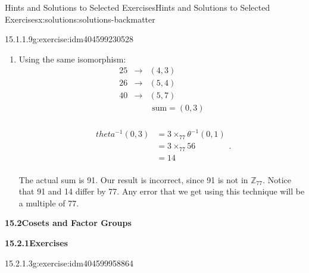 \documentclass[twoside,10pt,]{book}
\newcommand{\blocktitlefont}{\relax}
\numberwithin{equation}{section}
\begin{document}
\begin{solutions-chapter}{Hints and Solutions to Selected Exercises}{}{Hints and Solutions to Selected Exercises}{}{}{x:solutions:solutions-backmatter}
\begin{divisionsolution}{15.1.1.9}{}{g:exercise:idm404599230528}
\begin{enumerate}[label=(\alph*)]
\begin{equation*}
\begin{split}
& =55 +_{77}70\\
& =48\\
\end{split}\text{.}
\end{equation*}
%
\item{}Using the same isomorphism:%
\begin{equation*}
\begin{array}{ccc}
25 & \to  & (4,3) \\
26 & \to  & (5,4) \\
40 & \to  & (5,7) \\
&   & \textrm{ sum}=(0,3) \\
\end{array}
\end{equation*}
%
\par
%
\begin{equation*}
\begin{split}
theta ^{-1}(0,3) &= 3 \times_{77}\theta ^{-1}(0,1)\\
& = 3\times_{77} 56\\ 
& =14\\
\end{split}\text{.}
\end{equation*}
%
\par
The actual sum is 91. Our result is incorrect, since 91 is not in \(\mathbb{Z}_{77}\).  Notice that 91 and 14 differ by 77. Any error that we get using this technique will be a multiple of 77.%
\end{enumerate}
%
\end{divisionsolution}%
\par\smallskip
\noindent\textbf{\Large{}15.2\space\textperiodcentered\space{}Cosets and Factor Groups}
\par\smallskip
\par\smallskip
\noindent\textbf{\Large{}15.2.1\space\textperiodcentered\space{}Exercises}
\par\smallskip
{}%
\begin{divisionsolution}{15.2.1.3}{}{g:exercise:idm404599958864}%

\end{divisionsolution}
\end{solutions-chapter}
\end{document}
